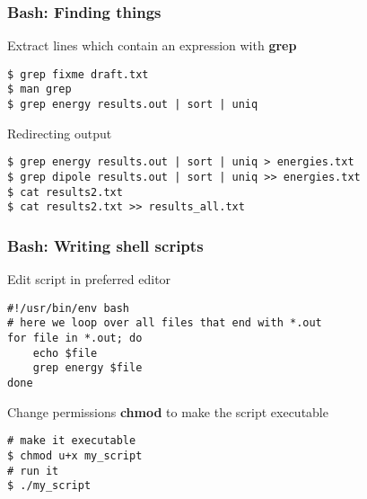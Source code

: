 \begin{frame}[fragile]
  \frametitle{Bash: Finding things}
  \begin{exampleblock}{Extract lines which contain an expression with \alert{\textbf{grep}}}
    \begin{verbatim}
$ grep fixme draft.txt
$ man grep
$ grep energy results.out | sort | uniq
    \end{verbatim}
  \end{exampleblock}

   \begin{exampleblock}{Redirecting output}
    \begin{verbatim}
$ grep energy results.out | sort | uniq > energies.txt  
$ grep dipole results.out | sort | uniq >> energies.txt
$ cat results2.txt
$ cat results2.txt >> results_all.txt
    \end{verbatim}
  \end{exampleblock}
\end{frame}

\begin{frame}[fragile]
  \frametitle{Bash: Writing shell scripts}
  \begin{exampleblock}{Edit script in preferred editor}
    \begin{verbatim}
#!/usr/bin/env bash
# here we loop over all files that end with *.out
for file in *.out; do
    echo $file
    grep energy $file
done
    \end{verbatim}
  \end{exampleblock}

   \begin{exampleblock}{Change permissions \alert{\textbf{chmod}} to make the script executable}
    \begin{verbatim}
# make it executable
$ chmod u+x my_script
# run it
$ ./my_script
    \end{verbatim}
  \end{exampleblock}
\end{frame}
